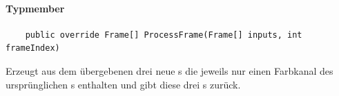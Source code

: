 \paragraph{Typmember}
\begin{itemize}

	\begin{verbatim}
	public override Frame[] ProcessFrame(Frame[] inputs, int frameIndex)
	\end{verbatim}
	Erzeugt aus dem übergebenen  drei neue s die jeweils nur einen Farbkanal des ursprünglichen s enthalten und gibt diese drei s zurück.
	
\end{itemize}